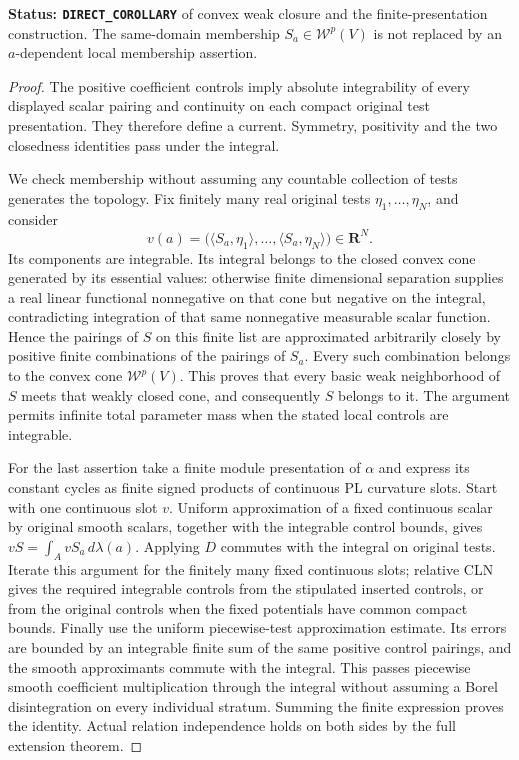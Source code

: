 \documentclass[11pt,a4paper]{article}
\numberwithin{equation}{section}
\theoremstyle{definition}
\theoremstyle{remark}
\begin{document}
\noindent\textbf{Status: \texttt{DIRECT\_COROLLARY}} of convex weak
closure and the finite-presentation construction. The same-domain
membership $S_a\in\mathcal W^p(V)$ is not replaced by an
$a$-dependent local membership assertion.

\begin{proof}
The positive coefficient controls imply absolute integrability of
every displayed scalar pairing and continuity on each compact
original test presentation. They therefore define a current. Symmetry,
positivity and the two closedness identities pass under the integral.

We check membership without assuming any countable collection of
tests generates the topology. Fix finitely many real original tests
$\eta_1,\ldots,\eta_N$, and consider
\[
 v(a)=\bigl(\langle S_a,\eta_1\rangle,\ldots,
                 \langle S_a,\eta_N\rangle\bigr)\in\mathbf R^N.
\]
Its components are integrable. Its integral belongs to the closed
convex cone generated by its essential values: otherwise finite
dimensional separation supplies a real linear functional nonnegative
on that cone but negative on the integral, contradicting integration
of that same nonnegative measurable scalar function. Hence the
pairings of $S$ on this finite list are approximated arbitrarily
closely by positive finite combinations of the pairings of $S_a$.
Every such combination belongs to the convex cone
$\mathcal W^p(V)$. This proves that every basic weak neighborhood of
$S$ meets that weakly closed cone, and consequently $S$ belongs to it.
The argument permits infinite total parameter mass when the stated
local controls are integrable.

For the last assertion take a finite module presentation of $\alpha$
and express its constant cycles as finite signed products of
continuous PL curvature slots. Start with one continuous slot $v$.
Uniform approximation of a fixed continuous scalar by original smooth
scalars, together with the integrable control bounds, gives
$vS=\int_AvS_a\,d\lambda(a)$.
Applying $D$ commutes with the integral on original tests. Iterate
this argument for the finitely many fixed continuous slots; relative
CLN gives the required integrable controls from the stipulated
inserted controls, or from the original controls when the fixed
potentials have common compact bounds. Finally use the uniform
piecewise-test approximation estimate. Its errors are bounded by
an integrable finite sum of the same positive control pairings,
and the smooth approximants commute with the integral. This passes
piecewise smooth coefficient multiplication through the integral
without assuming a Borel disintegration on every individual stratum.
Summing the finite expression
proves the identity. Actual relation independence holds on both
sides by the full extension theorem.
\end{proof}
\end{document}
